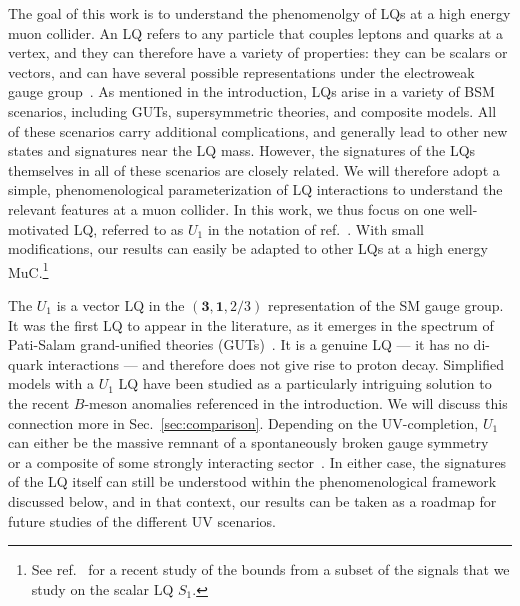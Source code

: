 \documentclass[a4paper,11pt]{article}
\newcommand{\muc}{MuC}
\begin{document}
The goal of this work is to understand the phenomenolgy of LQs at a high energy muon collider.
An LQ refers to any particle that couples leptons and quarks at a vertex, and they can therefore have a variety of properties: they can be scalars or vectors, and can have several possible representations under the electroweak gauge group~\cite{Buchmuller:1986zs}. 
As mentioned in the introduction, LQs arise in a variety of BSM scenarios, including GUTs, supersymmetric theories, and composite models.
All of these scenarios carry additional complications, and generally lead to other new states and signatures near the LQ mass.
However, the signatures of the LQs themselves in all of these scenarios are closely related. 
We will therefore adopt a simple, phenomenological parameterization of LQ interactions to understand the relevant features at a muon collider.
In this work, we thus focus on one well-motivated LQ, referred to as $U_1$ in the notation of ref.~\cite{Dorsner:2016wpm}.
With small modifications, our results can easily be adapted to other LQs at a high energy \muc.\footnote{See ref.~\cite{Huang:2021biu} for a recent study of the bounds from a subset of the signals that we study on the scalar LQ $S_1$.}


The $U_1$ is a vector LQ in the $(\mathbf{3}, \mathbf{1}, 2/3)$ representation of the SM gauge group. 
It was the first LQ to appear in the literature, as it emerges in the spectrum of Pati-Salam grand-unified theories (GUTs)~\cite{Pati:1973uk, Pati:1974yy}.
It is a genuine LQ --- it has no di-quark interactions --- and therefore does not give rise to proton decay. 
Simplified models with a $U_1$ LQ have been studied as a particularly intriguing solution to the recent $B$-meson anomalies referenced in the introduction.
We will discuss this connection more in Sec.~\ref{sec:comparison}.
Depending on the UV-completion, $U_1$ can either be the massive remnant of a spontaneously broken gauge symmetry~\cite{DiLuzio:2017vat, Assad:2017iib, Calibbi:2017qbu, Bordone:2017bld} or a composite of some strongly interacting sector~\cite{Barbieri:2017tuq, Blanke:2018sro}.
In either case, the signatures of the LQ itself can still be understood within the phenomenological framework discussed below, and in that context, our results can be taken as a roadmap for future studies of the different UV scenarios.
\end{document}

